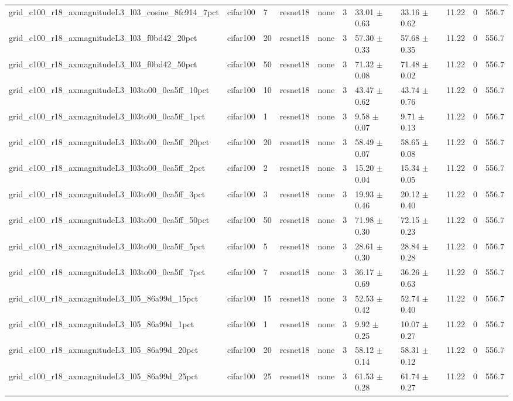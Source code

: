 \begin{tabular}{lllllllllll}
grid_c100_r18_axmagnitudeL3_l03_cosine_8fc914_7pct & cifar100 & 7 & resnet18 & none & 3 & 33.01 $\pm$ 0.63 & 33.16 $\pm$ 0.62 & 11.22 & 0 & 556.7 \\
grid_c100_r18_axmagnitudeL3_l03_f0bd42_20pct & cifar100 & 20 & resnet18 & none & 3 & 57.30 $\pm$ 0.33 & 57.68 $\pm$ 0.35 & 11.22 & 0 & 556.7 \\
grid_c100_r18_axmagnitudeL3_l03_f0bd42_50pct & cifar100 & 50 & resnet18 & none & 3 & 71.32 $\pm$ 0.08 & 71.48 $\pm$ 0.02 & 11.22 & 0 & 556.7 \\
grid_c100_r18_axmagnitudeL3_l03to00_0ca5ff_10pct & cifar100 & 10 & resnet18 & none & 3 & 43.47 $\pm$ 0.62 & 43.74 $\pm$ 0.76 & 11.22 & 0 & 556.7 \\
grid_c100_r18_axmagnitudeL3_l03to00_0ca5ff_1pct & cifar100 & 1 & resnet18 & none & 3 & 9.58 $\pm$ 0.07 & 9.71 $\pm$ 0.13 & 11.22 & 0 & 556.7 \\
grid_c100_r18_axmagnitudeL3_l03to00_0ca5ff_20pct & cifar100 & 20 & resnet18 & none & 3 & 58.49 $\pm$ 0.07 & 58.65 $\pm$ 0.08 & 11.22 & 0 & 556.7 \\
grid_c100_r18_axmagnitudeL3_l03to00_0ca5ff_2pct & cifar100 & 2 & resnet18 & none & 3 & 15.20 $\pm$ 0.04 & 15.34 $\pm$ 0.05 & 11.22 & 0 & 556.7 \\
grid_c100_r18_axmagnitudeL3_l03to00_0ca5ff_3pct & cifar100 & 3 & resnet18 & none & 3 & 19.93 $\pm$ 0.46 & 20.12 $\pm$ 0.40 & 11.22 & 0 & 556.7 \\
grid_c100_r18_axmagnitudeL3_l03to00_0ca5ff_50pct & cifar100 & 50 & resnet18 & none & 3 & 71.98 $\pm$ 0.30 & 72.15 $\pm$ 0.23 & 11.22 & 0 & 556.7 \\
grid_c100_r18_axmagnitudeL3_l03to00_0ca5ff_5pct & cifar100 & 5 & resnet18 & none & 3 & 28.61 $\pm$ 0.30 & 28.84 $\pm$ 0.28 & 11.22 & 0 & 556.7 \\
grid_c100_r18_axmagnitudeL3_l03to00_0ca5ff_7pct & cifar100 & 7 & resnet18 & none & 3 & 36.17 $\pm$ 0.69 & 36.26 $\pm$ 0.63 & 11.22 & 0 & 556.7 \\
grid_c100_r18_axmagnitudeL3_l05_86a99d_15pct & cifar100 & 15 & resnet18 & none & 3 & 52.53 $\pm$ 0.42 & 52.74 $\pm$ 0.40 & 11.22 & 0 & 556.7 \\
grid_c100_r18_axmagnitudeL3_l05_86a99d_1pct & cifar100 & 1 & resnet18 & none & 3 & 9.92 $\pm$ 0.25 & 10.07 $\pm$ 0.27 & 11.22 & 0 & 556.7 \\
grid_c100_r18_axmagnitudeL3_l05_86a99d_20pct & cifar100 & 20 & resnet18 & none & 3 & 58.12 $\pm$ 0.14 & 58.31 $\pm$ 0.12 & 11.22 & 0 & 556.7 \\
grid_c100_r18_axmagnitudeL3_l05_86a99d_25pct & cifar100 & 25 & resnet18 & none & 3 & 61.53 $\pm$ 0.28 & 61.74 $\pm$ 0.27 & 11.22 & 0 & 556.7 \\

\end{tabular}
